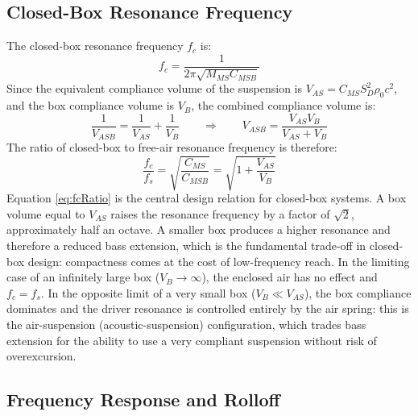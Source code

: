 \subsection{Closed-Box Resonance Frequency}
\label{ssc:921}

The closed-box resonance frequency \(f_c\) is:
\begin{equation}
    f_c = \frac{1}{2\pi\sqrt{M_{MS} C_{MSB}}}
    \label{eq:fcClosedBox}
\end{equation}
Since the equivalent compliance volume of the suspension is \(V_{AS} = C_{MS} S_D^2 \rho_0 c^2\), and the box compliance volume is \(V_B\), the combined compliance volume is:
\[
\frac{1}{V_{ASB}} = \frac{1}{V_{AS}} + \frac{1}{V_B}
\qquad\Longrightarrow\qquad
V_{ASB} = \frac{V_{AS} V_B}{V_{AS}+V_B}
\]
The ratio of closed-box to free-air resonance frequency is therefore:
\begin{equation}
    \frac{f_c}{f_s} = \sqrt{\frac{C_{MS}}{C_{MSB}}} = \sqrt{1 + \frac{V_{AS}}{V_B}}
    \label{eq:fcRatio}
\end{equation}
Equation \eqref{eq:fcRatio} is the central design relation for closed-box systems.
A box volume equal to \(V_{AS}\) raises the resonance frequency by a factor of \(\sqrt{2}\), approximately half an octave.
A smaller box produces a higher resonance and therefore a reduced bass extension, which is the fundamental trade-off in closed-box design: compactness comes at the cost of low-frequency reach.
In the limiting case of an infinitely large box (\(V_B \to \infty\)), the enclosed air has no effect and \(f_c = f_s\).
In the opposite limit of a very small box (\(V_B \ll V_{AS}\)), the box compliance dominates and the driver resonance is controlled entirely by the air spring: this is the air-suspension (acoustic-suspension) configuration, which trades bass extension for the ability to use a very compliant suspension without risk of overexcursion.

\subsection{Frequency Response and Rolloff}
\label{ssc:922}

